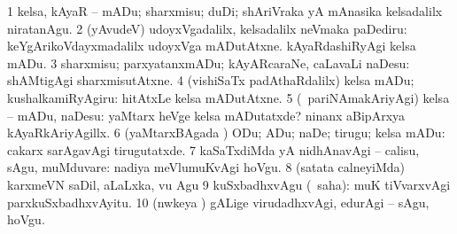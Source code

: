{{{{{{\begin{center}
\noindent
\gl{\akirx}
\expl{}
\bmng
\bnum
\num{1} kelsa, kAyaR -- mADu; sharxmisu; duDi; shAriVraka yA mAnasika kelsadalilx niratanAgu. 
\num{2} (yAvudeV) udoyxVgadalilx, kelsadalilx neVmaka paDediru:  keYgArikoVdayxmadalilx udoyxVga mADutAtxne.  kAyaRdashiRyAgi kelsa mADu. 
\num{3} sharxmisu; parxyatanxmADu; kAyARcaraNe, caLavaLi naDesu:  shAMtigAgi sharxmisutAtxne. 
\num{4} (vishiSaTx padAthaRdalilx) kelsa mADu; kushalkamiRyAgiru:  hitAtxLe kelsa mADutAtxne. 
\num{5} (\kanmu\ pariNAmakAriyAgi) kelsa -- mADu, naDesu:  yaMtarx heVge kelsa mADutatxde?  ninanx aBipArxya kAyaRkAriyAgillx. 
\num{6} (yaMtarxBAgada \vi) ODu; ADu; naDe; tirugu; kelsa mADu:  cakarx sarAgavAgi tirugutatxde. 
\num{7} kaSaTxdiMda yA nidhAnavAgi -- calisu, sAgu, muMduvare:  nadiya meVlumuKvAgi hoVgu. 
\num{8} (satata calneyiMda) karxmeVN saDil, aLaLxka, \mo vu Agu 
\num{9} kuSxbadhxvAgu (\rUpa\ saha):  muK tiVvarxvAgi parxkuSxbadhxvAyitu. 
\num{10} (nwkeya \vi) gALige virudadhxvAgi, edurAgi -- sAgu, hoVgu. 
\enum
\emng


\end{center}}}}}}}
